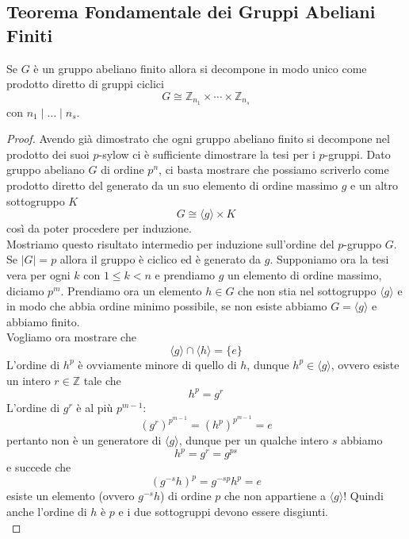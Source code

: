 \subsection{Teorema Fondamentale dei Gruppi Abeliani Finiti}
\begin{multicols}{2}
\begin{theorem}\label{tfgaf}
	Se $ G $ è un gruppo abeliano finito allora si decompone in modo unico come prodotto diretto di gruppi ciclici \[ G \cong \mathbb{Z}_{n_1} \times \cdots \times \mathbb{Z}_{n_s} \] con $ n_1 \mid \dots \mid n_s $.
\end{theorem}
\begin{proof}
	Avendo già dimostrato che ogni gruppo abeliano finito si decompone nel prodotto dei suoi $ p $-sylow ci è sufficiente dimostrare la tesi per i $ p $-gruppi. Dato gruppo abeliano $ G $ di ordine $ p^n $, ci basta mostrare che possiamo scriverlo come prodotto diretto del generato da un suo elemento di ordine massimo $ g $ e un altro sottogruppo $ K $
	\[ G \cong \langle g \rangle \times K \]
	così da poter procedere per induzione. \\
	
	Mostriamo questo risultato intermedio per induzione sull'ordine del $ p $-gruppo $ G $. Se $ |G|=p $ allora il gruppo è ciclico ed è generato da $ g $. Supponiamo ora la tesi vera per ogni $ k $ con $ 1 \leq k < n $ e prendiamo $ g $ un elemento di ordine massimo, diciamo $ p^m $. Prendiamo ora un elemento $ h \in G  $ che non stia nel sottogruppo $ \langle g \rangle $ e in modo che abbia ordine minimo possibile, se non esiste abbiamo $ G = \langle g \rangle $ e abbiamo finito. \\
	
	Vogliamo ora mostrare che 
	\[ \langle g \rangle \cap \langle h \rangle = \{e\} \]
	L'ordine di $ h^p $ è ovviamente minore di quello di $ h $, dunque $ h^p \in \langle g \rangle $, ovvero esiste un intero $ r \in \mathbb{Z} $ tale che
	\[ h^p = g^r \]
	L'ordine di $ g^r $ è al più $ p^{m-1} $: $$  (g^r)^{p^{m-1}} = (h^p)^{p^{m-1}} = e $$ pertanto non è un generatore di $ \langle g \rangle $, dunque per un qualche intero $ s $ abbiamo
	\[ h^p = g^r = g^{ps} \]
	e succede che 
	\[ (g^{-s}h)^p = g^{-sp}h^p = e \]
	esiste un elemento (ovvero $ g^{-s}h $)  di ordine $ p $ che non appartiene a $ \langle g \rangle $! Quindi anche l'ordine di $ h $ è $ p $ e i due sottogruppi devono essere disgiunti. \\
	

\end{proof}
\end{multicols}
